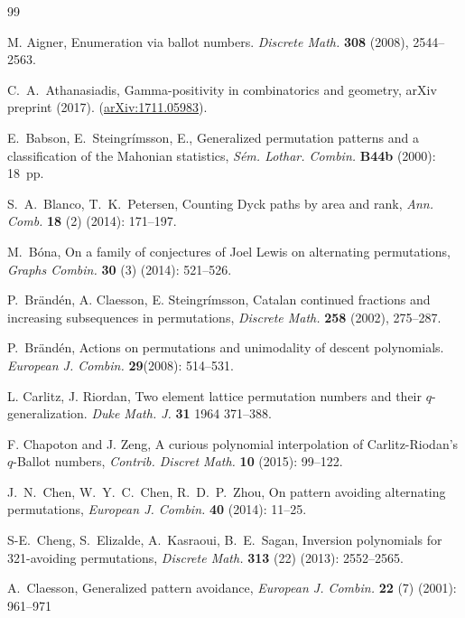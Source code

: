\documentclass[12pt,reqno]{amsart}
\numberwithin{equation}{section}
\theoremstyle{plain}
\theoremstyle{definition}
\begin{document}
\begin{thebibliography}{99}


 M. Aigner, Enumeration via ballot numbers. \textit{Discrete Math.} {\bf 308} (2008), 2544--2563.

 C.~A.~Athanasiadis, Gamma-positivity in combinatorics and geometry, arXiv preprint (2017). (\href{http://arxiv.org/abs/1711.05983}{arXiv:1711.05983}).

 E.~Babson, E.~Steingr\'imsson, E., Generalized permutation patterns and a classification of the Mahonian statistics, \textit{S\'em. Lothar. Combin.} {\bf B44b} (2000): 18~pp.


 S.~A.~Blanco, T.~K.~Petersen, Counting Dyck paths by area and rank, \textit{Ann. Comb.} {\bf 18} (2) (2014): 171--197.

 M.~B\'ona, On a family of conjectures of Joel Lewis on alternating permutations, \textit{Graphs Combin.} {\bf 30} (3) (2014): 521--526.

 P.~Br\"{a}nd\'{e}n, A. Claesson, E. Steingr\'{i}msson,
Catalan continued fractions and increasing subsequences in permutations, \textit{Discrete Math.} {\bf 258} (2002), 275--287.

 P.~Br\"{a}nd\'{e}n, Actions on permutations and unimodality of descent polynomials. \textit{European J. Combin.} {\bf 29}(2008): 514--531.

L. Carlitz, J.  Riordan, Two element lattice permutation numbers and their $q$-generalization. \textit{Duke Math. J.} {\bf 31} 1964 371--388.

F. Chapoton and J. Zeng, A curious polynomial interpolation of Carlitz-Riodan's $q$-Ballot numbers, \textit{Contrib. Discret Math.} {\bf 10} (2015): 99--122.

 J.~N.~Chen, W.~Y.~C.~Chen, R.~D.~P.~Zhou, On pattern avoiding alternating permutations, \textit{European J. Combin.} {\bf 40} (2014): 11--25.

 S-E.~Cheng, S.~Elizalde, A.~Kasraoui, B.~E.~Sagan, Inversion polynomials for 321-avoiding permutations, \textit{Discrete Math.} {\bf 313} (22) (2013): 2552--2565.

 A.~Claesson, Generalized pattern avoidance, \textit{European J. Combin.} {\bf 22} (7) (2001): 961--971


\end{thebibliography}
\end{document}
